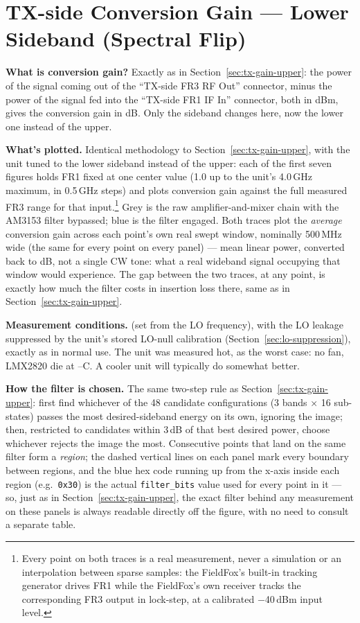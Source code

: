 \clearpage
\section{TX-side Conversion Gain --- Lower Sideband (Spectral Flip)}
\label{sec:tx-gain-lower}

\textbf{What is conversion gain?} Exactly as in Section~\ref{sec:tx-gain-upper}: the power of the signal coming out of the ``TX-side FR3 RF Out'' connector, minus the power of the signal fed into the ``TX-side FR1 IF In'' connector, both in dBm, gives
the conversion gain in dB. Only the sideband changes here, now the lower one instead of the upper.

\textbf{What's plotted.} Identical methodology to Section~\ref{sec:tx-gain-upper}, with the unit tuned to the
lower sideband instead of the upper: each of the first seven figures holds FR1 fixed at one center value (1.0
up to the unit's 4.0\,GHz maximum, in 0.5\,GHz steps) and plots conversion gain against the full measured FR3
range for that input.\footnote{Every point on both traces is a real measurement, never a simulation or an
interpolation between sparse samples: the FieldFox's built-in tracking generator drives FR1 while the
FieldFox's own receiver tracks the corresponding FR3 output in lock-step, at a calibrated −40\,dBm input
level.} Grey is the raw amplifier-and-mixer chain with the AM3153 filter bypassed; blue is the filter engaged.
Both traces plot the \emph{average} conversion gain across each point's own real swept window, nominally
500\,MHz wide (the same for every point on every panel) --- mean linear power, converted back to dB, not a
single CW tone: what a real wideband signal occupying that window would experience. The gap between the two
traces, at any point, is exactly how much the filter costs in insertion loss there, same as in
Section~\ref{sec:tx-gain-upper}.

\textbf{Measurement conditions.} \lmxDriveRule{} (set from the LO frequency), with the LO leakage suppressed by the unit's stored LO-null calibration (Section~\ref{sec:lo-suppression}), exactly as in normal use. The unit was measured hot, as the worst case: no fan, LMX2820 die at \condGainMinC--\condGainMaxC\textdegree C. A cooler unit will typically do somewhat better.

\textbf{How the filter is chosen.} The same two-step rule as Section~\ref{sec:tx-gain-upper}: first find
whichever of the 48 candidate configurations (3 bands × 16 sub-states) passes the most desired-sideband
energy on its own, ignoring the image; then, restricted to candidates within 3\,dB of that best desired power,
choose whichever rejects the image the most. Consecutive points that land on the same filter form a
\emph{region}; the dashed vertical lines on each panel mark every boundary between regions, and the blue hex
code running up from the x-axis inside each region (e.g.\ \texttt{0x30}) is the actual \texttt{filter\_bits}
value used for every point in it --- so, just as in Section~\ref{sec:tx-gain-upper}, the exact filter behind
any measurement on these panels is always readable directly off the figure, with no need to consult a separate
table.

